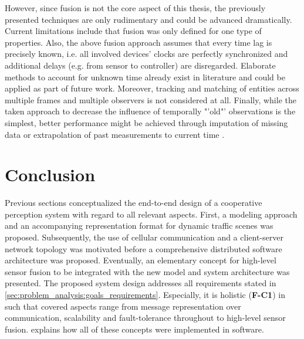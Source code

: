 However, since fusion is not the core aspect of this thesis, the previously presented techniques are only rudimentary and could be advanced dramatically. Current limitations include that fusion was only defined for one type of properties. Also, the above fusion approach assumes that every time lag is precisely known, i.e. all involved devices' clocks are perfectly synchronized and additional delays (e.g. from sensor to controller) are disregarded. Elaborate methods to account for unknown time already exist in literature \cite{Julier} and could be applied as part of future work. Moreover, tracking and matching of entities across multiple frames and multiple observers is not considered at all. Finally, while the taken approach to decrease the influence of temporally "'old"' observations is the simplest, better performance might be achieved through imputation of missing data or extrapolation of past measurements to current time \cite{Chen2019}. 

\section{Conclusion}
\label{sec:concept_design:conclusion}
Previous sections conceptualized the end-to-end design of a cooperative perception system with regard to all relevant aspects. First, a modeling approach and an accompanying representation format for dynamic traffic scenes was proposed. Subsequently, the use of cellular communication and a client-server network topology was motivated before a comprehensive distributed software architecture was proposed. Eventually, an elementary concept for high-level sensor fusion to be integrated with the new model and system architecture was presented. The proposed system design addresses all requirements stated in \cref{sec:problem_analysis:goals_requirements}. Especially, it is holistic (\textbf{F-C1}) in such that covered aspects range from message representation over communication, scalability and fault-tolerance throughout to high-level sensor fusion.  explains how all of these concepts were implemented in software. 